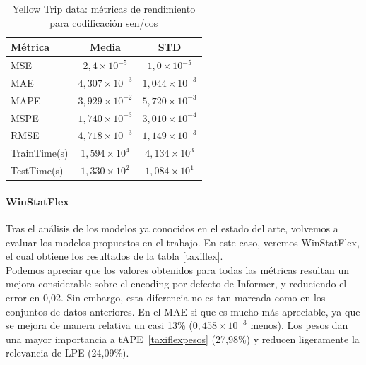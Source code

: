 \begin{table}[!ht]
	\centering
	\begin{tabular}{l|c|c}
		\toprule
		Métrica & Media & STD \\
		\midrule
		MSE & $2,4 \times 10^{-5}$ & $1,0 \times 10^{-5}$ \\
		MAE & $4,307 \times 10^{-3}$ & $1,044 \times 10^{-3}$ \\
		MAPE & $3,929 \times 10^{-2}$ & $5,720 \times 10^{-3}$ \\
		MSPE & $1,740 \times 10^{-3}$ & $3,010 \times 10^{-4}$ \\
		RMSE & $4,718 \times 10^{-3}$ & $1,149 \times 10^{-3}$ \\
		TrainTime(s) & $1,594 \times 10^{4}$ & $4,134 \times 10^{3}$ \\
		TestTime(s) & $1,330 \times 10^{2}$ & $1,084 \times 10^{1}$ \\
		\bottomrule
	\end{tabular}
	\caption{Yellow Trip data: métricas de rendimiento para codificación sen/cos}
	\label{taxipe}
\end{table}

\paragraph{WinStatFlex}

Tras el análisis de los modelos ya conocidos en el estado del arte, volvemos a evaluar los modelos propuestos en el trabajo. En este caso, veremos WinStatFlex, el cual obtiene los resultados de la tabla \ref{taxiflex}.\\

Podemos apreciar que los valores obtenidos para todas las métricas resultan un mejora considerable sobre el encoding por defecto de Informer, y reduciendo el error en 0,02. Sin embargo, esta diferencia no es tan marcada como en los conjuntos de datos anteriores. En el MAE si que es mucho más apreciable, ya que se mejora de manera relativa un casi 13\% ($0,458 \times 10^{-3}$ menos). Los pesos dan una mayor importancia a tAPE~\ref{taxiflexpesos} (27,98\%) y reducen ligeramente la relevancia de LPE (24,09\%).\\ 



